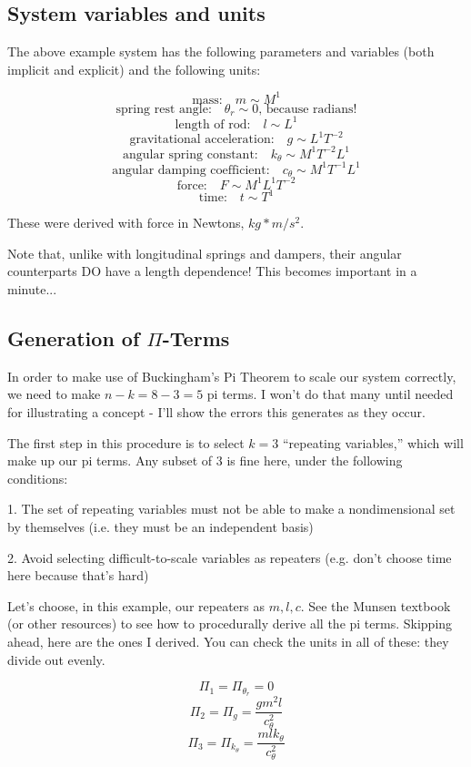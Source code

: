 \documentclass[12pt,letterpaper]{article}
\begin{document}
\subsection{System variables and units}

The above example system has the following parameters and variables (both implicit and explicit) and the following units:

\[
\text{mass:} \quad m \sim M^1
\]
\[
\text{spring rest angle:} \quad \theta_r \sim 0 \text{, because radians!}
\]
\[
\text{length of rod:} \quad l \sim L^1
\]
\[
\text{gravitational acceleration:} \quad g \sim L^1 T^{-2}
\]
\[
\text{angular spring constant:} \quad k_{\theta} \sim M^1 T^{-2} L^1 
\]
\[
\text{angular damping coefficient:} \quad c_{\theta} \sim M^1 T^{-1} L^1
\]
\[
\text{force:} \quad  F \sim M^1 L^1 T^{-2}
\]
\[
\text{time:} \quad t \sim T^1
\]

These were derived with force in Newtons, $kg*m/s^2$.

Note that, unlike with longitudinal springs and dampers, their angular counterparts DO have a length dependence! This becomes important in a minute...

\subsection{Generation of $\Pi$-Terms}

In order to make use of Buckingham's Pi Theorem to scale our system correctly, we need to make $n-k = 8-3 = 5$ pi terms. I won't do that many until needed for illustrating a concept - I'll show the errors this generates as they occur.

The first step in this procedure is to select $k=3$ ``repeating variables,'' which will make up our pi terms. Any subset of 3 is fine here, under the following conditions:

1. The set of repeating variables must not be able to make a nondimensional set by themselves (i.e. they must be an independent basis)

2. Avoid selecting difficult-to-scale variables as repeaters (e.g. don't choose time here because that's hard)


Let's choose, in this example, our repeaters as $m, l, c$. See the Munsen textbook (or other resources) to see how to procedurally derive all the pi terms. 
Skipping ahead, here are the ones I derived.
You can check the units in all of these: they divide out evenly.

\[
\Pi_1 = \Pi_{\theta_r} = 0
\]
\[
\Pi_2 = \Pi_{g} = \frac{gm^2l}{c_{\theta}^2}
\]
\[
\Pi_3 = \Pi_{k_{\theta}} = \frac{m l k_{\theta}}{c_{\theta}^2}
\]
\end{document}
